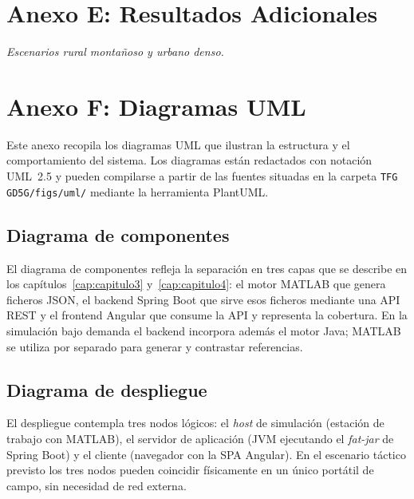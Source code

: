 \chapter{Anexo E: Resultados Adicionales}
\label{anx:resultados}
\textit{Escenarios rural montañoso y urbano denso.}

\chapter{Anexo F: Diagramas UML}
\label{anx:uml}

Este anexo recopila los diagramas UML que ilustran la estructura y el
comportamiento del sistema. Los diagramas están redactados con notación UML~2.5
y pueden compilarse a partir de las fuentes situadas en la carpeta
\texttt{TFG GD5G/figs/uml/} mediante la herramienta PlantUML.

\section{Diagrama de componentes}
\label{sec:uml_componentes}

El diagrama de componentes refleja la separación en tres capas que se describe
en los capítulos~\ref{cap:capitulo3} y~\ref{cap:capitulo4}: el motor MATLAB que
genera ficheros JSON, el backend Spring Boot que sirve esos ficheros mediante
una API REST y el frontend Angular que consume la API y representa la cobertura.
En la simulación bajo demanda el backend incorpora además el motor Java; MATLAB se
utiliza por separado para generar y contrastar referencias.


\section{Diagrama de despliegue}
\label{sec:uml_despliegue}

El despliegue contempla tres nodos lógicos: el \textit{host} de simulación
(estación de trabajo con MATLAB), el servidor de aplicación (JVM ejecutando el
\textit{fat-jar} de Spring Boot) y el cliente (navegador con la SPA Angular). En
el escenario táctico previsto los tres nodos pueden coincidir físicamente en un
único portátil de campo, sin necesidad de red externa.

